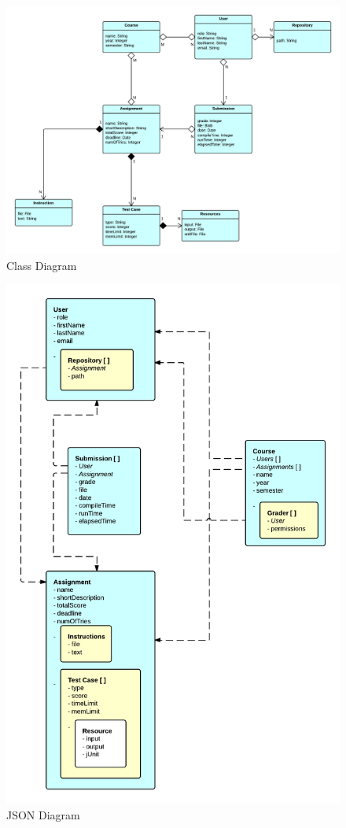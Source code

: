 \begin{figure}[H]
    \centering
    \includegraphics[width=\textwidth]{img/class-diagram}
    \caption{Class Diagram\label{fig:classdiagram}}
\end{figure}

\begin{figure}[H]
    \centering
    \includegraphics[width=\textwidth]{img/json-diagram}
    \caption{JSON Diagram\label{fig:jsondiagram}}
\end{figure}


